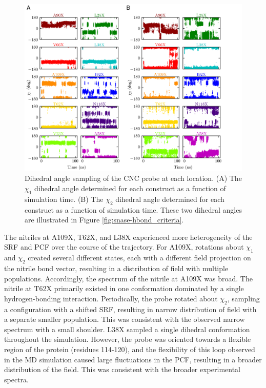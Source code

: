 \begin{figure}
    \center
    \includegraphics[width=\double]{figures-snase/combined_chi.png}
    \caption[Dihedral angle sampling of the CNC probe at each location]{
        Dihedral angle sampling of the CNC probe at each location. 
        (A) The $\chi_1$ dihedral angle determined for each construct as a function of simulation time. 
        (B) The $\chi_2$ dihedral angle determined for each construct as a function of simulation time. 
        These two dihedral angles are illustrated in Figure \ref{fig:snase-hbond_criteria}.
    }
    \label{fig:snase-chi}
\end{figure}

The nitriles at A109X, T62X, and L38X experienced more heterogeneity of the SRF and PCF over the course of the trajectory. 
For A109X, rotations about $\chi_1$ and $\chi_2$ created several different states, each with a different field projection on the nitrile bond vector, resulting in a distribution of field with multiple populations. 
Accordingly, the spectrum of the nitrile at A109X was broad. 
The nitrile at T62X primarily existed in one conformation dominated by a single hydrogen-bonding interaction. 
Periodically, the probe rotated about $\chi_2$, sampling a configuration with a shifted SRF, resulting in narrow distribution of field with a separate smaller population. 
This was consistent with the observed narrow spectrum with a small shoulder. 
L38X sampled a single dihedral conformation throughout the simulation. 
However, the probe was oriented towards a flexible region of the protein (residues 114-120), and the flexibility of this loop observed in the MD simulation caused large fluctuations in the PCF, resulting in a broader distribution of the field. 
This was consistent with the broader experimental spectra.


